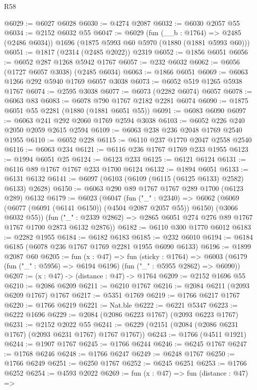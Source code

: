 \begin{lexlean}{R58}
\begin{coremodule}
@6029 := @6027 @6028
@6030 := @4274 @2087
@6032 := @6030 @2057 @55
@6034 := @2152 @6032 @55
@6047 := @6029
    (fun (__b : @1764) => @2485 (@2486 @6034))
    @1696
    (@1875 @5993 @60 @5970 (@1880 (@1881 @5993 @60)))
@6051 := @1817 (@2314 (@2485 @2022)) @2319
@6052 := @1856 @6051
@6056 := @6052 @287 @1268 @5942 @1767
@6057 := @232 @6032
@6062 := @6056 (@1727 @6057 @3038) (@2485 @6034)
@6063 := @1866 @6051
@6069 := @6063 @1266 @292 @5940 @1769 @6057 @3038
@6073 := @6052 @519 @1265 @5938 @1767
@6074 := @2595 @3038
@6077 := @6073 (@2282 @6074) @6057
@6078 := @6063 @83
@6083 := @6078 @790 @1767 @2182 @2281 @6074
@6090 := @1875 @6051 @55 @2281 (@1880 (@1881 @6051 @55))
@6091 := @6083 @6090
@6097 := @6063 @241 @292 @2060 @1769 @2594 @3038
@6103 := @6052 @226 @240 @2050 @2059 @2615 @2594
@6109 := @6063 @238 @236 @2048 @1769 @2540 @1955
@6110 := @6052 @228
@6115 := @6110 @237 @1770 @2047 @2558 @2540
@6116 := @6063 @234
@6121 := @6116 @236 @1767 @1769 @233 @1955
@6123 := @1994 @6051 @25
@6124 := @6123 @233
@6125 := @6121 @6124
@6131 := @6116 @89 @1767 @1767 @233 @1700 @6124
@6132 := @1894 @6051
@6133 := @6131 @6132
@6141 := @6097 (@6103 (@6109 (@6115 (@6125 @6133) @2582) @6133) @2628)
@6150 := @6063 @290 @89 @1767 @1767 @289 @1700 (@6123 @289) @6132
@6179 := @6023
    (@6047
      (fun ("_" : @2340) =>
      @6062 (@6069 (@6077 (@6091 (@6141 @6150)) (@4504 @2087 @2057 @55)) @6150) (@3066 @6032 @55))
      (fun ("_" : @2339 @2862) => @2865 @6051 @274 @276 @89 @1767 @1767 @1700 @2873 @6132 @2876))
@6182 := @6110 @300 @1770 @6012
@6183 := @2282 @1955
@6184 := @6182 @6183
@6185 := @232 @6010
@6194 := @6184 @6185 (@6078 @236 @1767 @1769 @2281 @1955 @6090 @6133)
@6196 := @1899 @2087 @60
@6205 := fun (x : @47) =>
  fun (sticky : @1764) =>
  @6003 (@6179 (fun ("_" : @5956) => @6194 @6196) (fun ("_" : @5955 @2862) => @6090))
@6207 := (x : @47) -> (distance : @47) -> @1764
@6209 := @2152 @1696 @55
@6210 := @2086 @6209
@6211 := @6210 @1767
@6216 := @2084 @6211 (@2093 @6209 @1767) @1767
@6217 := @5351 @1769
@6219 := @1766 @6217 @1767
@6220 := @1766 @6219
@6221 := Nat.ble
@6222 := @6221 @5347
@6223 := @6222 @1696
@6229 := @2084 (@2086 @6223 @1767) (@2093 @6223 @1767)
@6231 := @2152 @2022 @55
@6241 := @6229 (@2151 (@2084 (@2086 @6231 @1767) (@2093 @6231 @1767) @1767 @1767))
@6243 := @1766 (@4511 @1921)
@6244 := @1907 @1767
@6245 := @1766 @6244
@6246 := @6245 @1767
@6247 := @1768 @6246
@6248 := @1766 @6247
@6249 := @6248 @1767
@6250 := @1766 @6249
@6251 := @6250 @1767
@6252 := @6245 @6251
@6253 := @1766 @6252
@6254 := @4593 @2022
@6269 := fun (x : @47) =>
  fun (distance : @47) =>

\end{coremodule}
\end{lexlean}
